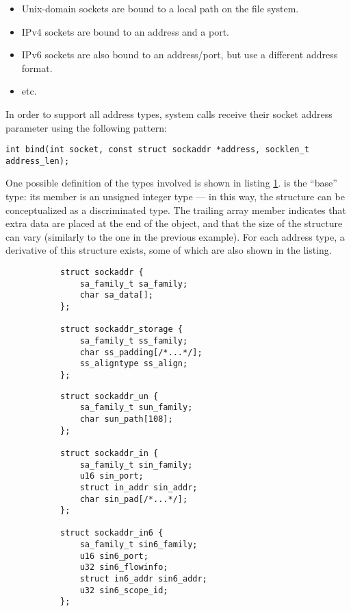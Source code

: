 
\begin{itemize}
    \item Unix-domain sockets are bound to a local path on the file system.
    \item IPv4 sockets are bound to an address and a port.
    \item
        IPv6 sockets are also bound to an address/port, but use a different
        address format.
    \item etc.
\end{itemize}

In order to support all address types, system calls receive their socket address
parameter using the following pattern:

\begin{lstlisting}[style=c]
int bind(int socket, const struct sockaddr *address, socklen_t address_len);
\end{lstlisting}

One possible definition of the types involved is shown in listing
\ref{lst:struct:sockaddr}.   is the ``base'' type: its
 member is an unsigned integer type --- in this way, the
structure can be conceptualized as a discriminated  type.  The
trailing array member  indicates that extra data are placed at
the end of the object, and that the size of the structure can vary (similarly to
the one in the previous example).  For each address type, a derivative of this
structure exists, some of which are also shown in the listing.

\begin{figure}[ht]
    \centering
    \begin{subfigure}[t]{0.45\textwidth}
        \begin{lstlisting}[style=c]
struct sockaddr {
    sa_family_t sa_family;
    char sa_data[];
};

struct sockaddr_storage {
    sa_family_t ss_family;
    char ss_padding[/*...*/];
    ss_aligntype ss_align;
};
        \end{lstlisting}
    \end{subfigure}
    \begin{subfigure}[t]{0.4\textwidth}
        \begin{lstlisting}[style=c]
struct sockaddr_un {
    sa_family_t sun_family;
    char sun_path[108];
};

struct sockaddr_in {
    sa_family_t sin_family;
    u16 sin_port;
    struct in_addr sin_addr;
    char sin_pad[/*...*/];
};

struct sockaddr_in6 {
    sa_family_t sin6_family;
    u16 sin6_port;
    u32 sin6_flowinfo;
    struct in6_addr sin6_addr;
    u32 sin6_scope_id;
};
        \end{lstlisting}
    \end{subfigure}
    \label{lst:struct:sockaddr}
\end{figure}

